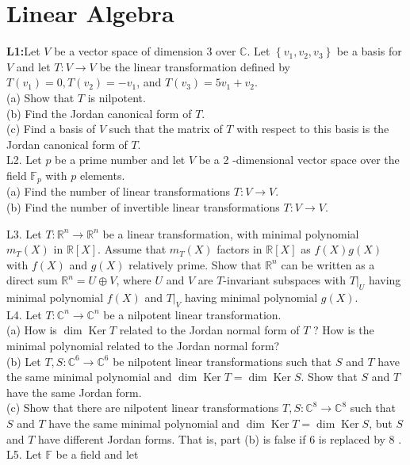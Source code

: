 \chapter{Linear Algebra}
\textbf{L1:}Let $V$ be a vector space of dimension 3 over $\mathbb{C}$. Let $\left\{v_{1}, v_{2}, v_{3}\right\}$ be a basis for $V$ and let $T: V \rightarrow V$ be the linear transformation defined by $T\left(v_{1}\right)=0, T\left(v_{2}\right)=-v_{1}$, and $T\left(v_{3}\right)=5 v_{1}+v_{2}$.\\
(a) Show that $T$ is nilpotent.\\
(b) Find the Jordan canonical form of $T$.\\
(c) Find a basis of $V$ such that the matrix of $T$ with respect to this basis is the Jordan canonical form of $T$.\\
L2. Let $p$ be a prime number and let $V$ be a 2 -dimensional vector space over the field $\mathbb{F}_{p}$ with $p$ elements.\\
(a) Find the number of linear transformations $T: V \rightarrow V$.\\
(b) Find the number of invertible linear transformations $T: V \rightarrow V$.

L3. Let $T: \mathbb{R}^{n} \rightarrow \mathbb{R}^{n}$ be a linear transformation, with minimal polynomial $m_{T}(X)$ in $\mathbb{R}[X]$. Assume that $m_{T}(X)$ factors in $\mathbb{R}[X]$ as $f(X) g(X)$ with $f(X)$ and $g(X)$ relatively prime. Show that $\mathbb{R}^{n}$ can be written as a direct sum $\mathbb{R}^{n}=U \oplus V$, where $U$ and $V$ are $T$-invariant subspaces with $\left.T\right|_{U}$ having minimal polynomial $f(X)$ and $\left.T\right|_{V}$ having minimal polynomial $g(X)$.\\
L4. Let $T: \mathbb{C}^{n} \rightarrow \mathbb{C}^{n}$ be a nilpotent linear transformation.\\
(a) How is $\operatorname{dim} \operatorname{Ker} T$ related to the Jordan normal form of $T$ ? How is the minimal polynomial related to the Jordan normal form?\\
(b) Let $T, S: \mathbb{C}^{6} \rightarrow \mathbb{C}^{6}$ be nilpotent linear transformations such that $S$ and $T$ have the same minimal polynomial and $\operatorname{dim} \operatorname{Ker} T=\operatorname{dim} \operatorname{Ker} S$. Show that $S$ and $T$ have the same Jordan form.\\
(c) Show that there are nilpotent linear transformations $T, S: \mathbb{C}^{8} \rightarrow \mathbb{C}^{8}$ such that $S$ and $T$ have the same minimal polynomial and $\operatorname{dim} \operatorname{Ker} T=\operatorname{dim} \operatorname{Ker} S$, but $S$ and $T$ have different Jordan forms. That is, part (b) is false if 6 is replaced by 8 .\\
L5. Let $\mathbb{F}$ be a field and let

